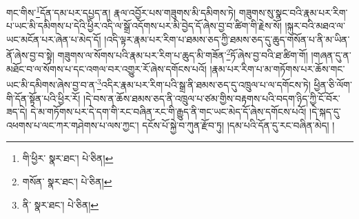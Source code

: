 གང་གིས་\footnote{གི་ཕྱིར་  སྣར་ཐང་།  པེ་ཅིན། }དོན་དམ་པར་དཔྱད་ན། རྣལ་འབྱོར་པས་གཟུགས་མི་དམིགས་ཏེ། གཟུགས་སུ་སྣང་བའི་རྣམ་པར་རིག་པ་ཡང་མི་དམིགས་པ་དེའི་ཕྱིར་འདི་ལ་སྒྲོ་འདོགས་པར་མི་བྱེད་དོ་ཞེས་བྱ་བ་ཚིག་གི་རྗེས་སོ། །སྐུར་བའི་མཐའ་ལ་ཡང་མངོན་པར་ཞེན་པ་མེད་དོ། །འདི་ལྟར་རྣམ་པར་རིག་པ་ཐམས་ཅད་ཀྱི་ཐམས་ཅད་དུ་ཆུད་གསོན་པ་ནི་མ་ཡིན་ནོ་ཞེས་བྱ་བ་སྟེ། གཟུགས་ལ་སོགས་པའི་རྣམ་པར་རིག་པ་ཆུད་མི་གཟོན་\footnote{གསོན་  སྣར་ཐང་།  པེ་ཅིན། }ཏོ་ཞེས་བྱ་བའི་ཐ་ཚིག་གོ། །གཞན་དུ་ན་མཐོང་བ་ལ་སོགས་པ་དང་འགལ་བར་འགྱུར་རོ་ཞེས་དགོངས་པའོ། །རྣམ་པར་རིག་པ་མ་གཏོགས་པར་ཆོས་གང་ཡང་མི་དམིགས་ཞེས་བྱ་བ་ན་\footnote{ནི་  སྣར་ཐང་།  པེ་ཅིན། }འདིར་རྣམ་པར་རིག་པའི་སྒྲ་ནི་ཐམས་ཅད་དུ་འཁྲུལ་པ་ལ་དགོངས་ཏེ། ཕྱིན་ཅི་ལོག་གི་དོན་སྟོན་པའི་ཕྱིར་རོ། །དེ་བས་ན་ཆོས་ཐམས་ཅད་ནི་འཁྲུལ་པ་ཙམ་གྱིས་བརྟགས་པའི་བདག་ཉིད་ཀྱི་ངོ་བོར་ཟད་དེ། དེ་མ་གཏོགས་པར་དེ་དག་གི་རང་བཞིན་རང་གི་རྒྱུད་ནི་གང་ཡང་མེད་དོ་ཞེས་དགོངས་པའོ། །དེ་སྐད་དུ་འཕགས་པ་ལང་ཀར་གཤེགས་པ་ལས་ཀྱང་། དངོས་པོ་སྐྱེ་བ་ཀུན་རྫོབ་ཏུ། །དམ་པའི་དོན་དུ་རང་བཞིན་མེད། །
